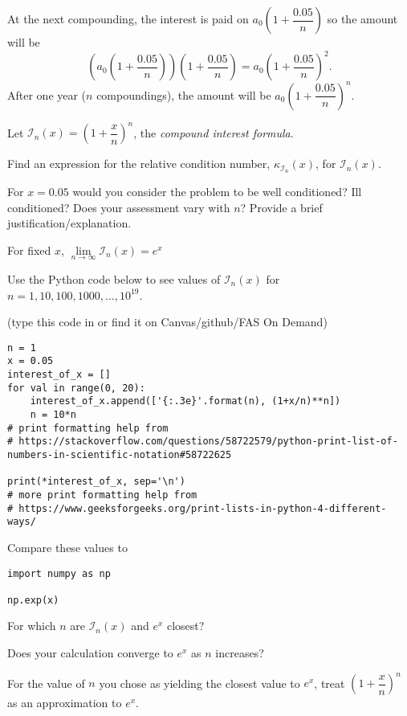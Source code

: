 \documentclass[12pt,letterpaper,noanswers]{exam}
\begin{document}
\begin{questions}
At the next compounding, the interest is paid on $a_0\left(1+\dfrac{0.05}{n}\right)$ so the amount will be \[\left(a_0\left(1+\dfrac{0.05}{n}\right)\right)\left(1+\dfrac{0.05}{n}\right) = a_0\left(1+\dfrac{0.05}{n}\right)^2.\]  After one year ($n$ compoundings), the amount will be $a_0\left(1+\dfrac{0.05}{n}\right)^n$.

Let $\mathcal{I}_n(x) = \left(1+\dfrac{x}{n}\right)^n$, the \emph{compound interest formula}.
\begin{parts}
\item Find an expression for the relative condition number, $\kappa_{\mathcal{I}_n}(x)$, for $\mathcal{I}_n(x)$.

For $x = 0.05$ would you consider the problem to be well conditioned?  Ill conditioned?  Does your assessment vary with $n$?  Provide a brief justification/explanation.

\item For fixed $x$, $\lim\limits_{n\rightarrow\infty}\mathcal{I}_n(x) = e^x$

Use the Python code below to see values of $\mathcal{I}_n(x)$ for $n=1,10,100,1000,...,10^{19}$.

(type this code in or find it on Canvas/github/FAS On Demand)

\begin{verbatim}
n = 1
x = 0.05
interest_of_x = []
for val in range(0, 20):
    interest_of_x.append(['{:.3e}'.format(n), (1+x/n)**n])
    n = 10*n
# print formatting help from
# https://stackoverflow.com/questions/58722579/python-print-list-of-numbers-in-scientific-notation#58722625

print(*interest_of_x, sep='\n')
# more print formatting help from
# https://www.geeksforgeeks.org/print-lists-in-python-4-different-ways/
\end{verbatim}
\vspace{0.1in}

Compare these values to
\begin{verbatim}
import numpy as np

np.exp(x)
\end{verbatim}

For which $n$ are $\mathcal{I}_n(x)$ and $e^x$ closest?

Does your calculation converge to $e^x$ as $n$ increases?

\item For the value of $n$ you chose as yielding the closest value to $e^x$, treat $\left(1+\dfrac{x}{n}\right)^n$ as an approximation to $e^x$.  


\end{parts}
\end{questions}
\end{document}
